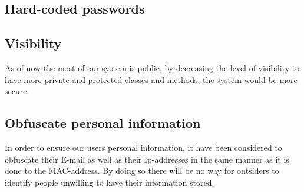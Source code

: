 \subsection*{Hard-coded passwords}
\subsection*{Visibility}
As of now the most of our system is public, by decreasing the level of visibility to have more private and protected classes and methods, the system would be more secure.
 
\subsection*{Obfuscate personal information}
In order to ensure our users personal information, it have been considered to obfuscate their E-mail as well as their Ip-addresses in the same manner as it is done to the MAC-address. By doing so there will be no way for outsiders to identify people unwilling to have their information stored.
